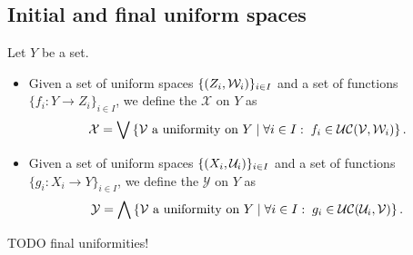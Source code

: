 \subsection{Initial and final uniform spaces}
\begin{definition}
Let $Y$ be a set.
\begin{itemize}
\item Given a set of uniform spaces $\{\left( Z_i, \mathcal{W}_i \right)\}_{i\in I}$ and a set of functions $\{f_i: Y\to Z_i\}_{i\in I}$, we define the  $\mathcal{X}$ on $Y$ as
\[ \mathcal{X} = \bigvee \left\{ \text{$\mathcal{V}$ a uniformity on $Y$} \;\middle|\; \forall i\in I:\; f_i\in \operatorname{\mathcal{UC}}(\mathcal{V}, \mathcal{W}_i) \right\}. \]
\item Given a set of uniform spaces $\{\left( X_i, \mathcal{U}_i \right)\}_{i\in I}$ and a set of functions $\{g_i: X_i\to Y\}_{i\in I}$, we define the  $\mathcal{Y}$ on $Y$ as
\[ \mathcal{Y} = \bigwedge \left\{ \text{$\mathcal{V}$ a uniformity on $Y$} \;\middle|\; \forall i\in I:\; g_i\in \operatorname{\mathcal{UC}}(\mathcal{U}_i, \mathcal{V}) \right\}. \]
\end{itemize}
\end{definition}

TODO final uniformities!

